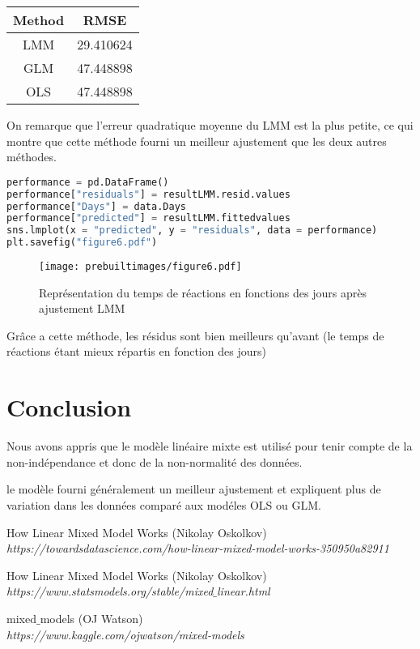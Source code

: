 \begin{center}
\begin{tabular}{ c c }
\hline
Method & RMSE\\
\hline
LMM	& 29.410624\\
GLM	& 47.448898\\
OLS	& 47.448898\\
\hline
\end{tabular}
\end{center}

On remarque que l'erreur quadratique moyenne du LMM est la plus petite, ce qui montre que cette méthode fourni un meilleur ajustement que les deux autres méthodes.

\newpage

\begin{lstlisting}[language=Python]
performance = pd.DataFrame()
performance["residuals"] = resultLMM.resid.values
performance["Days"] = data.Days
performance["predicted"] = resultLMM.fittedvalues
sns.lmplot(x = "predicted", y = "residuals", data = performance)
plt.savefig("figure6.pdf") 
\end{lstlisting}

\begin{figure}[H]
    \centering
    \texttt{[image: prebuiltimages/figure6.pdf]}
    \caption{Représentation du temps de réactions en fonctions des jours après ajustement LMM}
\end{figure}

Grâce a cette méthode, les résidus sont bien meilleurs qu'avant (le temps de réactions étant mieux répartis en fonction des jours)

\section{Conclusion}
Nous avons appris que le modèle linéaire mixte est utilisé pour tenir compte de la non-indépendance et donc de la non-normalité des données.


le modèle fourni généralement un meilleur ajustement et expliquent plus de variation dans les données comparé aux modéles OLS ou GLM.

\begin{thebibliography}{99}
 How Linear Mixed Model Works (Nikolay Oskolkov)\\
{\it https://towardsdatascience.com/how-linear-mixed-model-works-350950a82911}

 How Linear Mixed Model Works (Nikolay Oskolkov)\\
{\it https://www.statsmodels.org/stable/mixed$\_$linear.html}

 mixed$\_$models (OJ Watson)\\
{\it https://www.kaggle.com/ojwatson/mixed-models}
\end{thebibliography}

\newpage


